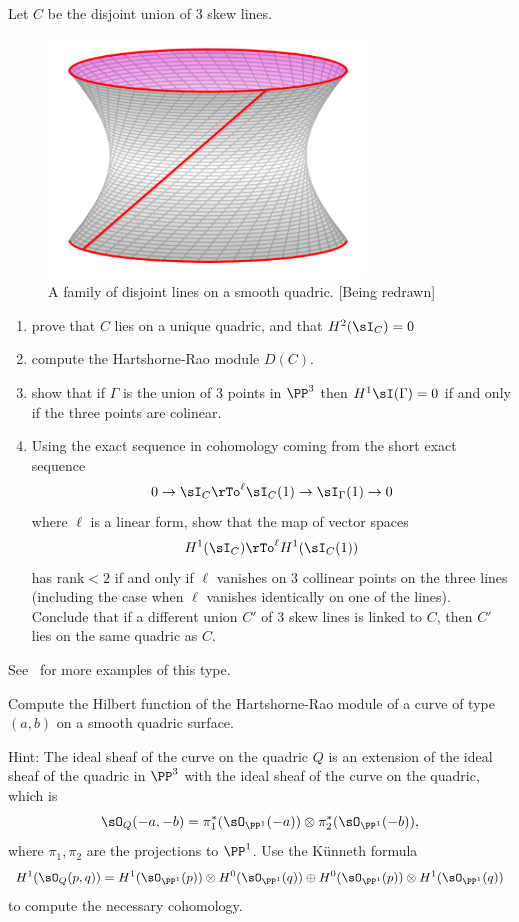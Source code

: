 \begin{exercise}
Let $C$ be the disjoint union of 3 skew lines. 

\begin{figure}
\inprogress
\centerline {\includegraphics[height=2.5in]{"main/Fig15-2-SinglyRuledHyperboloid"}}
\caption{A family of disjoint lines on a smooth quadric. [Being redrawn]}
\label{Fig15.2}
\end{figure}

\begin{enumerate}
 \item prove that $C$ lies on a unique quadric, and that $H^2(\sI_C) = 0$
 \item compute the Hartshorne-Rao module $D(C)$.
 \item show that if $\Gamma$ is the union of 3 points in $\PP^3$ then
 $H^1\sI(\Gamma) = 0$ if and only if the three points are colinear.
 \item Using the exact sequence in cohomology coming from the short exact sequence
$$
0\to \sI_C \rTo^{\ell} \sI_C(1) \to \sI_\Gamma(1) \to 0
$$
where $\ell$ is a linear form, show that the map of vector spaces
$$
H^1(\sI_C) \rTo^{\ell} H^1(\sI_C(1))
$$
has rank$<2$ if and only if $\ell$ vanishes on 3 collinear points on the three lines (including the case when $\ell$ vanishes identically on one of the lines).
Conclude that if a different union $C'$ of 3 skew lines is linked to $C$, then $C'$ lies on the same quadric as $C$.
\end{enumerate}
See~\cite{Migliore} for more examples of this type.
\end{exercise}

\begin{exercise}
 Compute the Hilbert function of the Hartshorne-Rao module of a curve of type $(a,b)$ on a smooth quadric surface.
 
 Hint: The ideal sheaf of the curve on the quadric $Q$ is an extension of the ideal sheaf of the quadric in $\PP^3$
 with the ideal sheaf of the curve on the quadric, which is 
 $$
 \sO_Q(-a,-b) = \pi_1^*(\sO_{\PP^1}(-a)) \otimes \pi_2^*(\sO_{\PP^1}(-b)),
 $$
 where $\pi_1, \pi_2$ are the projections to $\PP^1$. Use the K\"unneth formula
 $$
 H^1(\sO_Q(p,q)) = H^1(\sO_{\PP^1}(p)) \otimes H^0(\sO_{\PP^1}(q)) \oplus
  H^0(\sO_{\PP^1}(p)) \otimes H^1(\sO_{\PP^1}(q))
 $$
  to compute the necessary cohomology.
\end{exercise}

